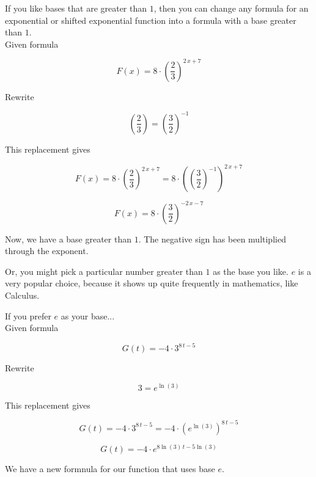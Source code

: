 \documentclass{ximera}
\begin{document}
\begin{example}

If you like bases that are greater than $1$, then you can change any formula for an exponential or shifted exponential function into a formula with a base greater than $1$. \\


Given formula 

\[
F(x) = 8 \cdot \left( \frac{2}{3} \right)^{2 \, x + 7}
\]



Rewrite 

\[
\left( \frac{2}{3} \right) = \left( \frac{3}{2} \right)^{-1}
\]


This replacement gives 



\[
F(x) = 8 \cdot \left( \frac{2}{3} \right)^{2 \, x + 7} = 8 \cdot \left( \left( \frac{3}{2} \right)^{-1} \right)^{2 \, x + 7}
\]

\[
F(x) = 8 \cdot \left( \frac{3}{2} \right)^{-2 \, x - 7}
\]


Now, we have a base greater than $1$.  The negative sign has been multiplied through the exponent.


\end{example}



Or, you might pick a particular number greater than $1$ as the base you like.  $e$ is a very popular choice, because it shows up quite frequently in mathematics, like Calculus.










\begin{example}

If you prefer $e$ as your base...\\


Given formula 

\[
G(t) = -4 \cdot 3^{8 \, t - 5}
\]



Rewrite 

\[
3 = e^{\ln(3)}
\]


This replacement gives 



\[
G(t) = -4 \cdot 3^{8 \, t - 5} = -4 \cdot \left( e^{\ln(3)} \right)^{8 \, t - 5}
\]

\[
G(t) = -4 \cdot e^{8 \ln(3) \, t - 5 \ln(3)}
\]


We have a new formnula for our function that uses base $e$.


\end{example}
\end{document}
